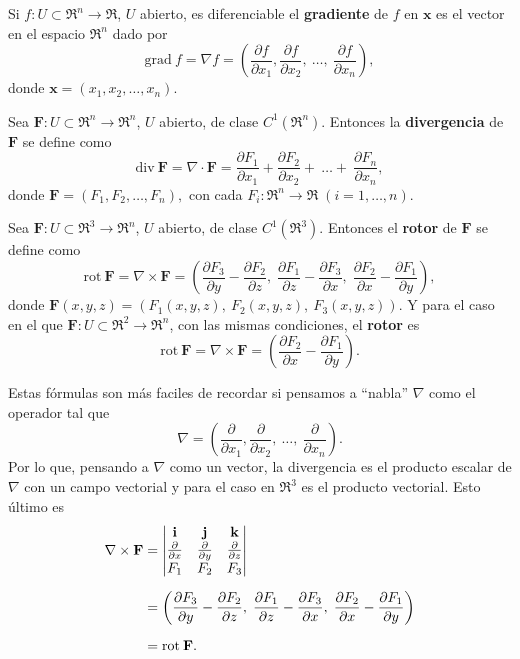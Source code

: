 \begin{definition}
    Si $f:U\subset\Re^n\to\Re$, $U$ abierto, es diferenciable el \textbf{gradiente} de $f$ en $\mathbf{x}$ es el vector en el espacio $\Re^n$ dado por 
    \[
        \text{grad}\:f=\nabla f=(\frac{\partial f}{\partial x_1},\frac{\partial f}{\partial x_2},\:\ldots,\: \frac{\partial f}{\partial x_n}),
    \]
    donde $\mathbf{x}=(x_1, x_2,\ldots, x_n)$.
\end{definition}
\begin{definition}
    Sea $\mathbf{F}:U\subset\Re^n\to\Re^n$, $U$ abierto, de clase $C^1(\Re^n)$. Entonces la \textbf{divergencia} de $\mathbf{F}$ se define como
    \[
        \text{div}\:\mathbf{F}=\nabla\cdot \mathbf{F}=  \frac{\partial F_1}{\partial x_1}+\frac{\partial F_2}{\partial x_2}+\:\ldots+\: \frac{\partial F_n}{\partial x_n},
    \]
    donde $\mathbf{F}=(F_1,F_2,\ldots,F_n),$ con cada $F_i:\Re^n\to\Re\;(i=1,\ldots,n)$.
\end{definition}
\begin{definition}
    Sea $\mathbf{F}:U\subset\Re^3\to\Re^n$, $U$ abierto, de clase $C^1(\Re^3)$. Entonces el \textbf{rotor} de $\mathbf{F}$ se define como 
    \[
        \text{rot}\:\mathbf{F}=\nabla\times\mathbf{F}=\left(\frac{\partial F_3}{\partial y}-\frac{\partial F_2}{\partial z},\;\frac{\partial F_1}{\partial z}-\frac{\partial F_3}{\partial x},\;\frac{\partial F_2}{\partial x}-\frac{\partial F_1}{\partial y}\right),
    \]   
    donde $\mathbf{F}(x,y,z)=(F_1(x,y,z),\:F_2(x,y,z),\:F_3(x,y,z))$.
    Y para el caso en el que $\mathbf{F}:U\subset\Re^2\to\Re^n$, con las mismas condiciones, el \textbf{rotor} es
    \[
        \text{rot}\:\mathbf{F}=\nabla\times\mathbf{F}=\left(\frac{\partial F_2}{\partial x}-\frac{\partial F_1}{\partial y}\right).
    \]
\end{definition}
    Estas f\'ormulas son m\'as faciles de recordar si pensamos a ``nabla'' $\nabla$ como el operador tal que 
    \[
        \nabla = (\frac{\partial}{\partial x_1},\frac{\partial}{\partial x_2},\:\ldots,\: \frac{\partial}{\partial x_n}).  
    \]
    Por lo que, pensando a $\nabla$ como un vector, la divergencia es el producto escalar de $\nabla$ con un campo vectorial y para el caso en $\Re^3$ es el producto vectorial. Esto \'ultimo es
    \begin{align*}
        \nabla\times\mathbf{F}&= 
        \begin{vmatrix}
        \mathbf{i} & \mathbf{j} & \mathbf{k} \\
        \frac{\partial}{\partial x} & \frac{\partial}{\partial y} & \frac{\partial}{\partial z} \\
        F_1 & F_2 & F_3
        \end{vmatrix} \\[.2cm]
        &=\left(\frac{\partial F_3}{\partial y}-\frac{\partial F_2}{\partial z},\;\frac{\partial F_1}{\partial z}-\frac{\partial F_3}{\partial x},\;\frac{\partial F_2}{\partial x}-\frac{\partial F_1}{\partial y}\right)\\[.2cm]
        &=\text{rot}\:\mathbf{F}.
    \end{align*}
